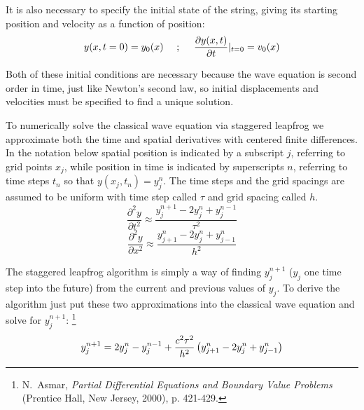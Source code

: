 It is also necessary to specify the initial state of the string,
giving its starting position and velocity as a function of position:
\begin{equation}\label{eq:WaveIC}
    y(x,t=0) = y_0(x)~~~~;~~~~{\partial y(x,t) \over \partial t} |_{t=0}    = v_0(x)
\end{equation}

Both of these initial conditions are necessary because the wave
equation is second order in time, just like Newton's second law, so
initial displacements and velocities must be specified to find a
unique solution.

To numerically solve the classical wave equation via staggered
leapfrog we approximate both the time and spatial derivatives with
centered finite differences. In the notation below spatial position
is indicated by a subscript $j$, referring to grid points $x_j$,
while position in time is indicated by superscripts $n$, referring
to time steps $t_n$ so that $y(x_j,t_n)=y_j^n$. The time steps and
the grid spacings are assumed to be uniform with time step called
$\tau$ and grid spacing called $h$.
\begin{equation}\label{eq:TimeDeriv}
    \frac{\partial^2 y}{\partial t^2} \approx
    \frac{y_j^{n+1} - 2 y_j^n + y_j^{n-1}}{\tau^2}
\end{equation}
\begin{equation}\label{eq:SpaceDeriv}
\frac{\partial^2 y }{\partial x^2} \approx
\frac{y^n_{j+1} - 2 y^n_{j} +  y^n_{j-1}}
{h^2}
\end{equation}



The staggered leapfrog algorithm is simply a way of finding
$y_j^{n+1}$ ($y_j$ one time step into the future) from the current
and previous values of $y_j$. To derive the algorithm just put these
two approximations into the classical wave equation and solve for
$y_j^{n+1}$: \footnote{N.\ Asmar, {\it Partial Differential
Equations and Boundary Value Problems} (Prentice Hall, New Jersey,
2000), p. 421-429.}
\begin{equation}
    y_j^{n+1} = 2 y_j^n - y_j^{n-1} + {c^2 \tau^2 \over h^2}
    \left( y^n_{j+1} - 2 y^n_{j} +  y^n_{j-1}
    \right)
    \label{leapfrog}
\end{equation}

